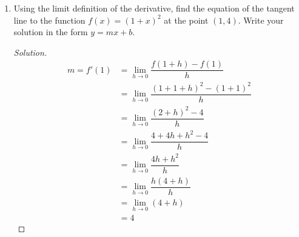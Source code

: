 \documentclass[12pt]{article}
\newenvironment{solution}{\begin{proof}[Solution]}{\end{proof}}
\begin{document}
\begin{enumerate}
			
			
	\item Using the limit definition of the derivative, find the equation of the tangent line to the function $f(x)=(1+x)^2$ at the point $(1,4)$. Write your solution in the form $y=mx+b$.
	\begin{solution}
		\begin{align*}
			m=f'(1)&=\displaystyle{\lim_{h \to 0} 		\dfrac{f(1+h)-f(1)}{h}}\\
			&=\displaystyle{\lim_{h \to 0}\dfrac{(1+1+h)^2-(1+1)^2}{h}}\\
			&=\displaystyle{\lim_{h\to 0}\dfrac{(2+h)^2-4}{h}}\\
			&=\displaystyle{\lim_{h\to 0}\dfrac{4+4h+h^2-4}{h}}\\
			&=\displaystyle{\lim_{h\to 0}\dfrac{4h+h^2}{h}}\\
			&=\displaystyle{\lim_{h \to 0}\dfrac{h(4+h)}{h}}\\
			&=\displaystyle{\lim_{h\to 0}(4+h)}\\
			&=4			
		\end{align*}
		

\end{solution}
\end{enumerate}
\end{document}
